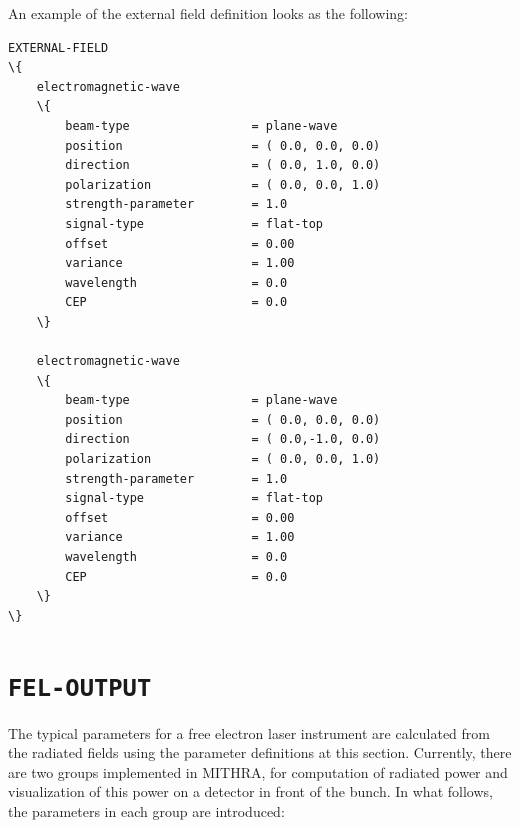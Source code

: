 An example of the external field definition looks as the following:
%
\begin{snugshade}
\begin{Verbatim}[fontsize=\small, tabsize=4, fontfamily=courier, fontseries=b, commandchars=\\\{\}, obeytabs]
EXTERNAL-FIELD
\{
	electromagnetic-wave
	\{
		beam-type				  = plane-wave
		position				  = ( 0.0, 0.0, 0.0)
    	direction				  = ( 0.0, 1.0, 0.0)
    	polarization			  = ( 0.0, 0.0, 1.0)
    	strength-parameter		  = 1.0
    	signal-type				  = flat-top
    	offset					  = 0.00
    	variance				  = 1.00
    	wavelength				  = 0.0
    	CEP						  = 0.0
	\}
	
	electromagnetic-wave
	\{
		beam-type				  = plane-wave
		position				  = ( 0.0, 0.0, 0.0)
		direction				  = ( 0.0,-1.0, 0.0)
		polarization			  = ( 0.0, 0.0, 1.0)
		strength-parameter		  = 1.0
		signal-type				  = flat-top
		offset					  = 0.00
		variance				  = 1.00
		wavelength				  = 0.0
		CEP						  = 0.0
	\}
\}
\end{Verbatim}
\end{snugshade}
%

\section{\texttt{FEL-OUTPUT}}

The typical parameters for a free electron laser instrument are calculated from the radiated fields using the parameter definitions at this section.
%
Currently, there are two groups implemented in MITHRA, for computation of radiated power and visualization of this power on a detector in front of the bunch.
%
In what follows, the parameters in each group are introduced:


